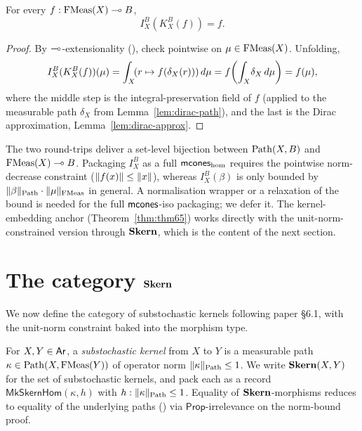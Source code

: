 \begin{theorem}[Round-trip $I \circ K = \id$ at the linhom level]%
\label{thm:IK}\rocqok\mathcompok
{}%
For every $f : \mathrm{FMeas}(X) \multimap B$,
\[
  I^B_X(K^B_X(f)) = f.
\]
\end{theorem}
\begin{proof}
By $\multimap$-extensionality (),
check pointwise on $\mu \in \mathrm{FMeas}(X)$. Unfolding,
\[
  I^B_X(K^B_X(f))(\mu)
    = \int_{X}\!(r \mapsto f(\delta_X(r)))\,d\mu
    = f\!\left(\int_{X}\!\delta_X\,d\mu\right)
    = f(\mu),
\]
where the middle step is the integral-preservation field of $f$
(applied to the measurable path $\delta_X$ from
Lemma~\ref{lem:dirac-path}), and the last is the Dirac
approximation, Lemma~\ref{lem:dirac-approx}.
\end{proof}

\begin{remark}
The two round-trips deliver a set-level bijection between
$\mathrm{Path}(X, B)$ and $\mathrm{FMeas}(X) \multimap B$. Packaging $I^B_X$ as a full
$\mathsf{mcones}_{\mathrm{hom}}$ requires the pointwise norm-decrease
constraint 
($\lVert f(x) \rVert \le \lVert x \rVert$), whereas $I^B_X(\beta)$ is only
bounded by $\lVert \beta \rVert_{\mathrm{Path}} \cdot \lVert \mu \rVert_{\mathrm{FMeas}}$ in general.
A normalisation wrapper or a relaxation of the bound is needed for
the full $\mathsf{mcones}$-iso packaging; we defer it. The kernel-embedding anchor
(Theorem~\ref{thm:thm65}) works directly with the
unit-norm-constrained version through $\mathbf{Skern}$, which is the
content of the next section.
\end{remark}

\section{The category \texorpdfstring{$\mathbf{Skern}$}{Skern}}\label{sec:skern}

We now define the category of substochastic kernels following paper
\S6.1, with the unit-norm constraint baked into the morphism type.

\begin{definition}\label{def:skern-hom}%
\rocqok\mathcompok
{}%
For $X, Y \in \mathsf{Ar}$, a \emph{substochastic kernel} from $X$ to $Y$ is a
measurable path $\kappa \in \mathrm{Path}(X, \mathrm{FMeas}(Y))$ of operator norm
$\lVert \kappa \rVert_{\mathrm{Path}} \le 1$. We write $\mathbf{Skern}(X, Y)$ for the set of
substochastic kernels, and pack each as a record
$\mathsf{MkSkernHom}(\kappa, h)$ with $h : \lVert \kappa \rVert_{\mathrm{Path}} \le
1$. Equality of $\mathbf{Skern}$-morphisms reduces to equality of the
underlying paths
() via
$\mathsf{Prop}$-irrelevance on the norm-bound proof.
\end{definition}

